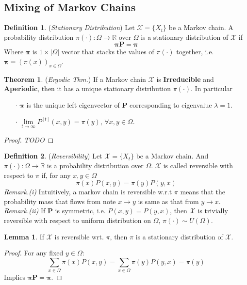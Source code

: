 \documentclass[a4paper, 11pt]{article}
\theoremstyle{definition}
\newtheorem{theorem}{Theorem}
\newtheorem{lemma}{Lemma}
\newtheorem{definition}{Definition}
\begin{document}
\subsection{Mixing of Markov Chains}
\begin{definition} (\textit{Stationary Distribution}) Let $\mathcal{X}=\{X_t\}$ be a Markov chain. A probability distribution $\pi(\cdot): \Omega\to \mathbb{R}$ over $\Omega$ is a stationary distribution of $\mathcal{X}$ if
$$\bm{\pi}\bm{P}=\bm{\pi}$$
Where $\bm{\pi}$ is $1\times |\Omega|$ vector that stacks the values of $\pi(\cdot)$ together, i.e. $\bm{\pi}=(\pi(x))_{x\in \Omega}$.
\end{definition}

\begin{theorem} (\textit{Ergodic Thm.}) If a Markov chain $\mathcal{X}$ is \textbf{Irreducible} and \textbf{Aperiodic}, then it has a unique stationary distribution $\pi(\cdot)$. In particular
\begin{itemize}
	\item[$\cdot$] $\bm{\pi}$ is the unique left eigenvector of $\bm{P}$ corresponding to eigenvalue $\lambda = 1$.
	\item[$\cdot$] $\lim\limits_{t\rightarrow\infty}P^{[t]}(x,y)=\pi(y)$, $\forall x, y\in\Omega$.
\end{itemize}
\end{theorem}

\begin{proof} \textit{TODO}
\end{proof}

\begin{definition} (\textit{Reversibility}) Let $\mathcal{X}=\{X_t\}$ be a Markov chain. And $\pi(\cdot): \Omega \to \mathbb{R}$ is a probability distribution over $\Omega$. $\mathcal{X}$ is called reversible with respect to $\pi$ if, for any $x,y\in \Omega$
$$\pi(x)P(x,y)=\pi(y)P(y,x)$$
\textit{Remark.(i)} Intuitively, a markov chain is reversible w.r.t $\pi$ means that the probability mass that flows from note $x \to y$ is same as that from $y \to x$.  \\
\textit{Remark.(ii)} If $\bm{P}$ is symmetric, i.e. $P(x,y)=P(y,x)$, then $\mathcal{X}$ is trivially reversible with respect to uniform distribution on $\Omega$, $\pi(\cdot)\sim U(\Omega)$.
\end{definition}

\begin{lemma} If $\mathcal{X}$ is reversible wrt. $\pi$, then $\pi$ is a stationary distribution of $\mathcal{X}$.
\end{lemma}
\begin{proof} For any fixed $y\in \Omega$:
$$\sum_{x\in\Omega}\pi(x)P(x,y)=\sum_{x\in\Omega}\pi(y)P(y,x)=\pi(y)$$
Implies $\bm{\pi}\bm{P}=\bm{\pi}$.
\end{proof}
\end{document}
